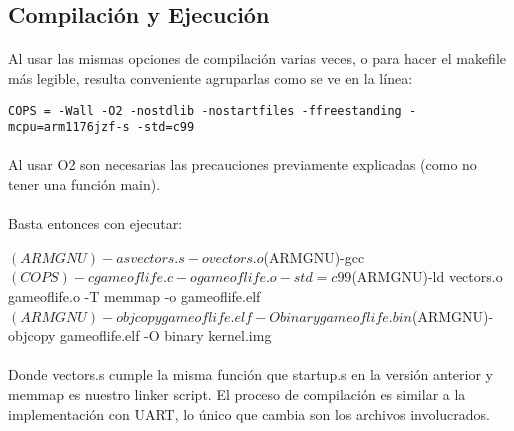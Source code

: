 \documentclass{article}
\begin{document}
\subsection{Compilaci\'on y Ejecuci\'on}

\paragraph{}
Al usar las mismas opciones de compilaci\'on varias veces, o para hacer el makefile m\'as legible, resulta conveniente agruparlas como se ve en la l\'inea:

\begin{lstlisting}
COPS = -Wall -O2 -nostdlib -nostartfiles -ffreestanding -mcpu=arm1176jzf-s -std=c99
\end{lstlisting}

\paragraph{}
Al usar O2 son necesarias las precauciones previamente explicadas (como no tener una funci\'on main). \cite{DwelchReadme}

\paragraph{}
Basta entonces con ejecutar:

\begin{commandshell}
$(ARMGNU)-as vectors.s -o vectors.o
$(ARMGNU)-gcc $(COPS) -c gameoflife.c -o gameoflife.o -std=c99
$(ARMGNU)-ld vectors.o gameoflife.o -T memmap -o gameoflife.elf
$(ARMGNU)-objcopy gameoflife.elf -O binary gameoflife.bin
$(ARMGNU)-objcopy gameoflife.elf -O binary kernel.img
\end{commandshell}

\paragraph{}
Donde vectors.s cumple la misma funci\'on que startup.s en la versi\'on anterior y memmap es nuestro linker script. El proceso de compilaci\'on es similar a la implementaci\'on con UART, lo \'unico que cambia son los archivos involucrados.

\newpage

\nocite{*}


\end{document}
